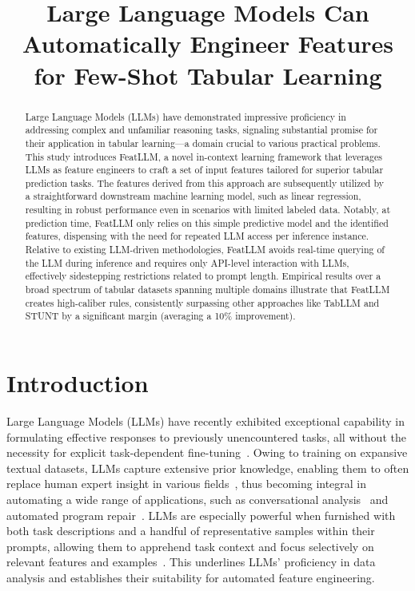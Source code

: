 \title{Large Language Models Can Automatically Engineer Features for Few-Shot Tabular Learning}

\begin{abstract}
Large Language Models (LLMs) have demonstrated impressive proficiency in addressing complex and unfamiliar reasoning tasks, signaling substantial promise for their application in tabular learning—a domain crucial to various practical problems. This study introduces \textsf{FeatLLM}, a novel in-context learning framework that leverages LLMs as feature engineers to craft a set of input features tailored for superior tabular prediction tasks. The features derived from this approach are subsequently utilized by a straightforward downstream machine learning model, such as linear regression, resulting in robust performance even in scenarios with limited labeled data. Notably, at prediction time, \textsf{FeatLLM} only relies on this simple predictive model and the identified features, dispensing with the need for repeated LLM access per inference instance. Relative to existing LLM-driven methodologies, \textsf{FeatLLM} avoids real-time querying of the LLM during inference and requires only API-level interaction with LLMs, effectively sidestepping restrictions related to prompt length. Empirical results over a broad spectrum of tabular datasets spanning multiple domains illustrate that \textsf{FeatLLM} creates high-caliber rules, consistently surpassing other approaches like TabLLM and STUNT by a significant margin (averaging a 10\% improvement).
\end{abstract}

\section{Introduction}
Large Language Models (LLMs) have recently exhibited exceptional capability in formulating effective responses to previously unencountered tasks, all without the necessity for explicit task-dependent fine-tuning~\cite{creswell2022selection,imani2023mathprompter,taylor2022galactica}. Owing to training on expansive textual datasets, LLMs capture extensive prior knowledge, enabling them to often replace human expert insight in various fields~\cite{Genomes2021,singhal2023large,wilcox2003role}, thus becoming integral in automating a wide range of applications, such as conversational analysis~\cite{finch2023leveraging} and automated program repair~\cite{fan2023automated}. LLMs are especially powerful when furnished with both task descriptions and a handful of representative samples within their prompts, allowing them to apprehend task context and focus selectively on relevant features and examples~\cite{brown2020language,zhao2023survey}. This underlines LLMs’ proficiency in data analysis and establishes their suitability for automated feature engineering.

